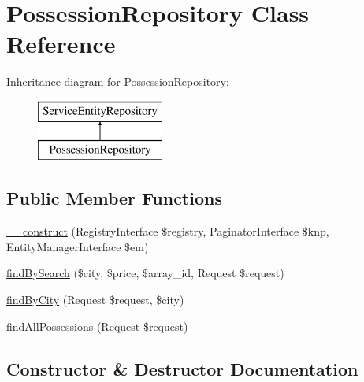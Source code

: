 \hypertarget{class_app_1_1_repository_1_1_possession_repository}{}\section{Possession\+Repository Class Reference}
\label{class_app_1_1_repository_1_1_possession_repository}
Inheritance diagram for Possession\+Repository\+:\begin{figure}[H]
\begin{center}
\leavevmode
\includegraphics[height=2.000000cm]{class_app_1_1_repository_1_1_possession_repository}
\end{center}
\end{figure}
\subsection*{Public Member Functions}
\begin{DoxyCompactItemize}
\item 
\mbox{\hyperlink{class_app_1_1_repository_1_1_possession_repository_a3243afa65458d1612acd42b950b79945}{\+\_\+\+\_\+construct}} (Registry\+Interface \$registry, Paginator\+Interface \$knp, Entity\+Manager\+Interface \$em)
\item 
\mbox{\hyperlink{class_app_1_1_repository_1_1_possession_repository_a1be6e403d71ecec030ece871b6680447}{find\+By\+Search}} (\$city, \$price, \$array\+\_\+id, Request \$request)
\item 
\mbox{\hyperlink{class_app_1_1_repository_1_1_possession_repository_a082496306ddf5b8bb19ff08b8761d736}{find\+By\+City}} (Request \$request, \$city)
\item 
\mbox{\hyperlink{class_app_1_1_repository_1_1_possession_repository_abf88daf778cad1e3aa6a5ed23c218840}{find\+All\+Possessions}} (Request \$request)
\end{DoxyCompactItemize}


\subsection{Constructor \& Destructor Documentation}
\mbox{\label{class_app_1_1_repository_1_1_possession_repository_a3243afa65458d1612acd42b950b79945}} 
